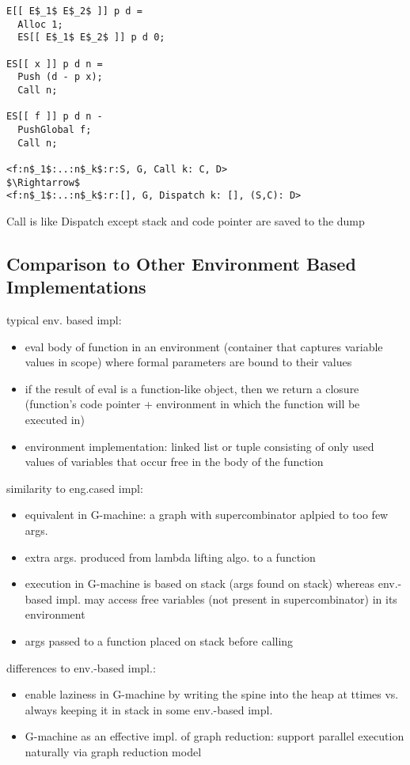 \documentclass[8pt]{extarticle}
\begin{document}
\begin{multicols*}{2}
\begin{lstlisting}
E[[ E$_1$ E$_2$ ]] p d =
  Alloc 1;
  ES[[ E$_1$ E$_2$ ]] p d 0;

ES[[ x ]] p d n =
  Push (d - p x);
  Call n;

ES[[ f ]] p d n -
  PushGlobal f;
  Call n;

<f:n$_1$:..:n$_k$:r:S, G, Call k: C, D>
$\Rightarrow$
<f:n$_1$:..:n$_k$:r:[], G, Dispatch k: [], (S,C): D>
\end{lstlisting}

Call is like Dispatch except stack and code pointer are saved to the dump


\subsection{Comparison to Other Environment Based Implementations}

typical env. based impl:
\begin{itemize}
\item eval body of function in an environment (container that captures variable values in scope) where formal parameters are bound to their values
\item if the result of eval is a function-like object, then we return a closure (function's code pointer + environment in which the function will be executed in)
\item environment implementation: linked list or tuple consisting of only used values of variables that occur free in the body of the function
\end{itemize}

similarity to eng.cased impl:
\begin{itemize}
\item equivalent in G-machine: a graph with supercombinator aplpied to too few args.
\item extra args. produced from lambda lifting algo. to a function
\item execution in G-machine is based on stack (args found on stack) whereas env.-based impl. may access free variables (not present in supercombinator) in its environment
\item args passed to a function placed on stack before calling 
\end{itemize}

differences to env.-based impl.:
\begin{itemize}
\item enable laziness in G-machine by writing the spine into the heap at ttimes vs. always keeping it in stack in some env.-based impl.
\item G-machine as an effective impl. of graph reduction: support parallel execution naturally via graph reduction model
\end{itemize}


\end{multicols*}
\end{document}
